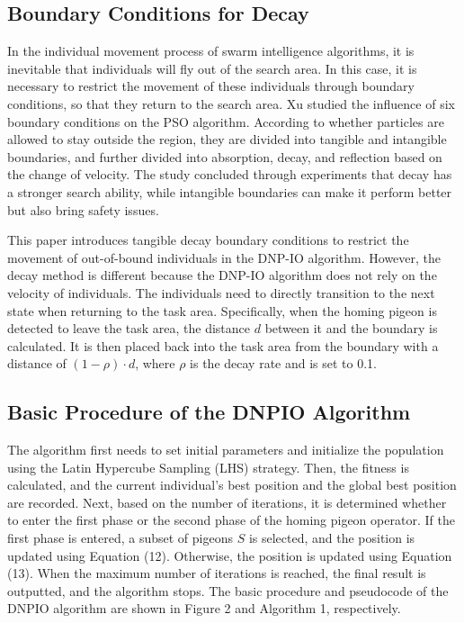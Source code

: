 \documentclass[preprint,review,compress,12pt]{elsarticle}
\begin{document}
\subsection{Boundary Conditions for Decay}
In the individual movement process of swarm intelligence algorithms, it is inevitable that individuals will fly out of the search area. In this case, it is necessary to restrict the movement of these individuals through boundary conditions\cite{ccinar2017boundary,qin2019accelerated}, so that they return to the search area. Xu\cite{xu2007boundary} studied the influence of six boundary conditions on the PSO algorithm. According to whether particles are allowed to stay outside the region, they are divided into tangible and intangible boundaries, and further divided into absorption, decay, and reflection based on the change of velocity. The study concluded through experiments that decay has a stronger search ability, while intangible boundaries can make it perform better but also bring safety issues.

This paper introduces tangible decay boundary conditions to restrict the movement of out-of-bound individuals in the DNP-IO algorithm. However, the decay method is different because the DNP-IO algorithm does not rely on the velocity of individuals. The individuals need to directly transition to the next state when returning to the task area. Specifically, when the homing pigeon is detected to leave the task area, the distance $d$ between it and the boundary is calculated. It is then placed back into the task area from the boundary with a distance of $(1 - \rho ) \cdot d$, where $\rho$ is the decay rate and is set to 0.1.

\subsection{Basic Procedure of the DNPIO Algorithm}
The algorithm first needs to set initial parameters and initialize the population using the Latin Hypercube Sampling (LHS) strategy. Then, the fitness is calculated, and the current individual's best position and the global best position are recorded. Next, based on the number of iterations, it is determined whether to enter the first phase or the second phase of the homing pigeon operator. If the first phase is entered, a subset of pigeons $S$ is selected, and the position is updated using Equation (12). Otherwise, the position is updated using Equation (13). When the maximum number of iterations is reached, the final result is outputted, and the algorithm stops. The basic procedure and pseudocode of the DNPIO algorithm are shown in Figure 2 and Algorithm 1, respectively.
\end{document}
